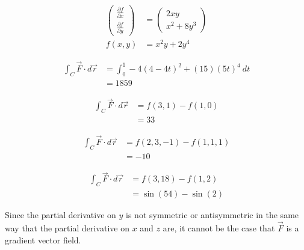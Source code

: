 \documentclass[8pt]{extarticle}
\begin{document}
  \begin{problem}{18.3}
    \begin{description}[font=\normalfont]
      \item[14:]
        \begin{align*}
          \begin{pmatrix}\frac{\partial f}{\partial x}\\\frac{\partial f}{\partial y}\end{pmatrix} &= \begin{pmatrix}2xy\\x^2 + 8y^3\end{pmatrix}\\
          f(x,y) &= x^2y + 2y^4
        \end{align*}
      \item[16:]
        \begin{align*}
          \int_{C}\vec{F}\cdot d\vec{r} &= \int_{0}^{1} -4(4-4t)^2 + (15)(5t)^4~dt\\
                                       &= 1859
        \end{align*}
      \item[18:]
        \begin{align*}
          \int_{C}\vec{F}\cdot d\vec{r} &= f(3,1) - f(1,0)\\
                                        &= 33
        \end{align*}
      \item[20:]
        \begin{align*}
          \int_{C} \vec{F}\cdot d\vec{r} &= f(2,3,-1) - f(1,1,1)\\
                                         &= -10
        \end{align*}
      \item[24:]
        \begin{align*}
          \int_{C}\vec{F} \cdot d\vec{r} &= f(3,18) - f(1,2)\\
                                         &= \sin(54) - \sin(2)
        \end{align*}
      \item[30:]
      \item[32:] Since the partial derivative on $y$ is not symmetric or antisymmetric in the same way that the partial derivative on $x$ and $z$ are, it cannot be the case that $\vec{F}$ is a gradient vector field.
      \item[38:]
    \end{description}
  \end{problem}
\end{document}
